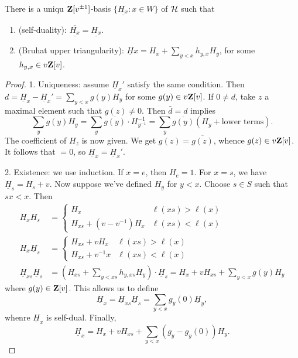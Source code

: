 \documentclass{article}
\begin{document}
\begin{theorem}
There is a uniqu $\mathbf{Z}[v^{\pm 1}]$-basis $\{\underline{H_x}:x\in W\}$ of 
$\mathcal{H}$ such that 
\begin{enumerate}
  \item (self-duality): $\overline{\underline{H_x}} = \underline{H_x}$. 
  \item (Bruhat upper triangularity): $\underline Hx = H_x + \sum_{y<x} h_{y,x} H_y$, 
    for some $h_{y,x}\in v \mathbf{Z}[v]$. 
\end{enumerate}
\end{theorem}
\begin{proof}
1. Uniqueness: assume $\underline H_x'$ satisfy the same condition. Then 
$d=\underline H_x - \underline H_x' = \sum_{y<x} g(y) H_y$ for some 
$g(y)\in v\mathbf{Z}[v]$. If $0\ne d$, take $z$ a maximal element such that 
$g(z)\ne 0$. Then $\bar d=d$ implies 
\[
  \sum_y g(y) H_y = \sum_y \overline{g(y)} \cdot H_{y^{-1}}^{-1} = \sum_y \overline{g(y)} (H_y+\text{lower terms}) .
\]
The coefficient of $H_z$ is now given. We get $g(z)=\overline{g(z)}$, whence 
$g(z)\in v \mathbf{Z}[v]$. It follows that $=0$, so $\underline H_x = \underline H_x'$. 

2. Existence: we use induction. If $x=e$, then $H_e = 1$. For $x=s$, we have 
$\underline H_s = H_s + v$. Now suppose we've defined $H_y$ for 
$y<x$. Choose $s\in S$ such that $s x<x$. Then 
\begin{align*}
  H_x H_s 
    &= \begin{cases} H_x & \ell(x s)>\ell(x) \\ H_{x s} + (v-v^{-1}) H_x & \ell(x s) < \ell(x) \end{cases} \\
  H_x \underline H_s &= 
  \begin{cases} H_{x s} + v H_x & \ell(x s)>\ell(x) \\ 
  H_{x s} + v^{-1} x & \ell(x s) < \ell(x) \end{cases} \\
  \underline H_{x s} \underline H_s &= (H_{x s} + \sum_{y<x s} h_{y, x s} H_y)\cdot \underline H_s = H_x + v H_{x s} + \sum_{y<x} g(y) H_y 
\end{align*}
where $g(y)\in \mathbf{Z}[v]$. This allows us to define 
\[
  \underline H_x = \underline H_{x s} \underline H_s = \sum_{y<x} g_y(0) \underline H_y ,
\]
whenre $\underline H_x$ is self-dual. Finally, 
\[
  \underline H_x = H_x + v H_{x s} + \sum_{y<x} (g_y - g_y(0)) H_y .
\]
\end{proof}
\end{document}
